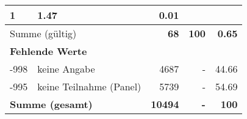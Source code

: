 \begin{longtable}{lXrrr}
       \num{1} &
       \num[round-mode=places,round-precision=2]{1,47} &
         \num[round-mode=places,round-precision=2]{0,01} \\
     \midrule
     \multicolumn{2}{l}{Summe (gültig)} &
       \textbf{\num{68}} &
     \textbf{100} &
       \textbf{\num[round-mode=places,round-precision=2]{0,65}} \\
     \multicolumn{5}{l}{\textbf{Fehlende Werte}}\\
       -998 &
       keine Angabe &
         \num{4687} &
        - &
         \num[round-mode=places,round-precision=2]{44,66} \\
       -995 &
       keine Teilnahme (Panel) &
         \num{5739} &
        - &
         \num[round-mode=places,round-precision=2]{54,69} \\
     \midrule
     \multicolumn{2}{l}{\textbf{Summe (gesamt)}} &
          \textbf{\num{10494}} &
        \textbf{-} &
        \textbf{100} \\
     \bottomrule
     \end{longtable}
     
